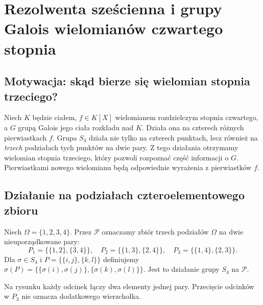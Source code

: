 \chapter[Rezolwenta sześcienna i grupy Galois]{Rezolwenta sześcienna i grupy Galois wielomianów czwartego stopnia}\label{aa:ch:quartic-resolvent}

\section{Motywacja: skąd bierze się wielomian stopnia trzeciego?}
Niech $K$ będzie ciałem, $f\in K[X]$ wielomianem rozdzielczym
stopnia czwartego, a $G$ grupą Galois jego ciała rozkładu nad $K$.
Działa ona na czterech różnych pierwiastkach $f$.
Grupa $S_4$ działa nie tylko na czterech punktach, lecz również
na \emph{trzech} podziałach tych punktów na dwie pary.
Z tego działania otrzymamy wielomian stopnia trzeciego,
który pozwoli rozpoznać część informacji o $G$. Pierwiastkami
nowego wielomianu będą odpowiednie wyrażenia z pierwiastków $f$.

\section{Działanie na podziałach czteroelementowego zbioru}
\begin{definicja}\label{aa:def:quartic-pairings}
Niech $\Omega=\{1,2,3,4\}$. Przez $\mathcal P$ oznaczamy zbiór
trzech podziałów $\Omega$ na dwie nieuporządkowane pary:
\[
 P_1=\{\{1,2\},\{3,4\}\},\quad
 P_2=\{\{1,3\},\{2,4\}\},\quad
 P_3=\{\{1,4\},\{2,3\}\}.
\]
Dla $\sigma\in S_4$ i $P=\{\{i,j\},\{k,l\}\}$ definiujemy
$\sigma(P)=\{\{\sigma(i),\sigma(j)\},\{\sigma(k),\sigma(l)\}\}$.
Jest to działanie grupy $S_4$ na $\mathcal P$.
\end{definicja}

\begin{center}
\end{center}
\begin{uwaga}
Na rysunku każdy odcinek łączy dwa elementy jednej pary.
Przecięcie odcinków w $P_3$ nie oznacza dodatkowego wierzchołka.
\end{uwaga}

